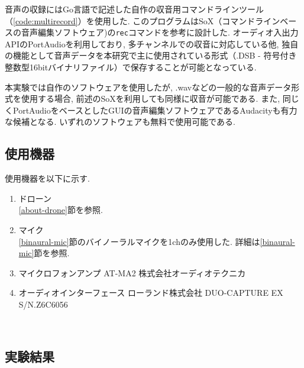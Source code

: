 音声の収録にはGo言語で記述した自作の収音用コマンドラインツール（\ref{code:multirecord}）を使用した. 
このプログラムはSoX（コマンドラインベースの音声編集ソフトウェア)\cite{sox:online}の\texttt{rec}コマンドを参考に設計した. 
オーディオ入出力APIのPortAudio\cite{portaudio:online}を利用しており, 多チャンネルでの収音に対応している他, 独自の機能として音声データを本研究で主に使用されている形式（.DSB - 符号付き整数型16bitバイナリファイル）で保存することが可能となっている. 

本実験では自作のソフトウェアを使用したが, .wavなどの一般的な音声データ形式を使用する場合, 前述のSoXを利用しても同様に収音が可能である. また, 同じくPortAudioをベースとしたGUIの音声編集ソフトウェアであるAudacity\cite{audacity:online}も有力な候補となる. いずれのソフトウェアも無料で使用可能である. 

\subsection{使用機器}\label{used-equipments-drone}

使用機器を以下に示す. 

\begin{enumerate}
\renewcommand{\labelenumi}{(\arabic{enumi})}
\item
  ドローン\\
  \ref{about-drone}節を参照. 
\item
  マイク \\
  \ref{binaural-mic}節のバイノーラルマイクを1chのみ使用した. 詳細は\ref{binaural-mic}節を参照. 
\item
  マイクロフォンアンプ AT-MA2 株式会社オーディオテクニカ

\item
  オーディオインターフェース ローランド株式会社 DUO-CAPTURE EX S/N.Z6C6056
  \cite{audio_interface:online}
\end{enumerate}

\
\subsection{実験結果}\label{result-drone}

